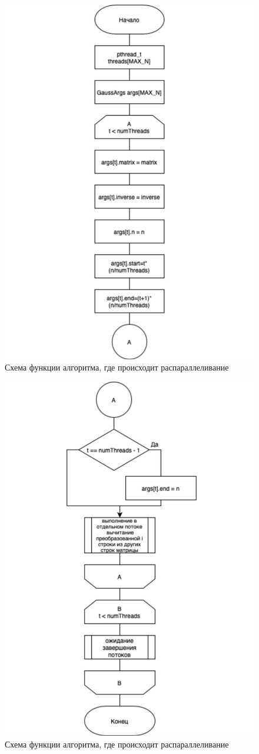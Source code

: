 \begin{figure}[h]
    \centering
    \includegraphics[width=0.75\linewidth]{img/paral3.pdf}
    \caption{Схема функции алгоритма, где происходит распараллеливание}
    \label{fig:paral3}
\end{figure}

\begin{figure}[h]
    \centering
    \includegraphics[width=0.7\linewidth]{img/paral4.pdf}
    \caption{Схема функции алгоритма, где происходит распараллеливание}
    \label{fig:paral4}
\end{figure}

